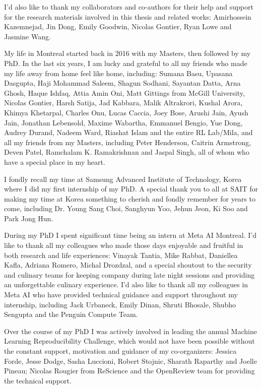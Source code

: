 \documentclass[letterpaper, 12pt]{report}
\begin{document}
I'd also like to thank my collaborators and co-authors for their help and support for the research materials involved in this thesis and related works: Amirhossein Kazemnejad, Jin Dong, Emily Goodwin, Nicolas Gontier, Ryan Lowe and Jasmine Wang.

My life in Montreal started back in 2016 with my Masters, then followed by my PhD. In the last six years, I am lucky and grateful to all my friends who made my life away from home feel like home, including: Sumana Basu, Upasana Dasgupta, Haji Mohammad Saleem, Shagun Sodhani, Sayantan Datta, Arna Ghosh, Haque Ishfaq, Attia Amin Oni, Matt Gittings from McGill University, Nicolas Gontier, Harsh Satija, Jad Kabbara, Malik Altrakrori, Kushal Arora, Khimya Khetarpal, Charles Onu, Lucas Caccia, Joey Bose, Arushi Jain, Ayush Jain, Jonathan Lebensold, Maxime Wabartha, Emmanuel Bengio, Yue Dong, Audrey Durand, Nadeem Ward, Riashat Islam and the entire RL Lab/Mila, and all my friends from my Masters, including Peter Henderson, Caitrin Armstrong, Deven Patel, Ramchalam K. Ramakrishnan and Jaspal Singh, all of whom who have a special place in my heart.

I fondly recall my time at Samsung Advanced Institute of Technology, Korea where I did my first internship of my PhD. A special thank you to all at SAIT for making my time at Korea something to cherish and fondly remember for years to come, including Dr. Young Sang Choi, Sanghyun Yoo, Jehun Jeon, Ki Soo and Park Jong Hun.

During my PhD I spent significant time being an intern at Meta AI Montreal. I'd like to thank all my colleagues who made those days enjoyable and fruitful in both research and life experiences: Vinayak Tantia, Mike Rabbat, Daniellea Kafla, Adriana Romero, Michal Drozdzal, and a special shoutout to the security and culinary teams for keeping company during late night sessions and providing an unforgettable culinary experience. I'd also like to thank all my colleagues in Meta AI who have provided technical guidance and support throughout my internship, including Jack Urbaneck, Emily Dinan, Shruti Bhosale, Shubho Sengupta and the Penguin Compute Team.

Over the course of my PhD I was actively involved in leading the annual Machine Learning Reproducibility Challenge, which would not have been possible without the constant support, motivation and guidance of my co-organizers: Jessica Forde, Jesse Dodge, Sasha Luccioni, Robert Stojnic, Sharath Raparthy and Joelle Pineau; Nicolas Rougier from ReScience and the OpenReview team for providing the technical support.
\end{document}

